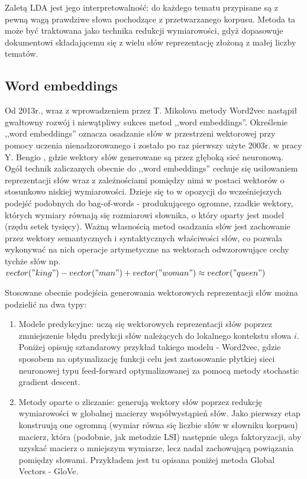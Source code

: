 \documentclass[pl]{minipw} %
\begin{document}
Zaletą LDA jest jego interpretowalność: do każdego tematu przypisane są z pewną wagą prawdziwe słowa pochodzące z przetwarzanego korpusu. Metoda ta może być traktowana jako technika redukcji wymiarowości, gdyż dopasowuje dokumentowi składającemu się z wielu słów reprezentację złożoną z małej liczby tematów.


\subsection{Word embeddings}
Od 2013r., wraz z wprowadzeniem przez T. Mikolova metody Word2vec \cite{word2vec} nastąpił gwałtowny rozwój i niewątpliwy sukces metod ,,word embeddings''. Określenie ,,word embeddings'' oznacza osadzanie słów w przestrzeni wektorowej przy pomocy uczenia nienadzorowanego i zostało po raz pierwszy użyte 2003r. w pracy Y. Bengio \cite{bengio}, gdzie wektory słów generowane są przez głęboką sieć neuronową. Ogół technik zaliczanych obecnie do ,,word embeddings'' cechuje się usiłowaniem reprezentacji słów wraz z zależnościami pomiędzy nimi w postaci wektorów o stosunkowo niskiej wymiarowości. Dzieje się to w opozycji do wcześniejszych podejść podobnych do bag-of-words - produkującego ogromne, rzadkie wektory, których wymiary równają się rozmiarowi słownika, o który oparty jest model (rzędu setek tysięcy). Ważną własnością metod osadzania słów jest zachowanie przez wektory semantycznych i syntaktycznych właściwości słów, co pozwala wykonywać na nich operacje artymetyczne na wektorach odwzorowujące cechy tychże słów np.~$vector("king")-vector("man")+vector("woman") \approx vector("queen")$ 

Stosowane obecnie podejścia generowania wektorowych reprezentacji słów można podzielić na dwa typy:
\begin{enumerate}
	\item Modele predykcyjne: uczą się wektorowych reprezentacji słów poprzez zmniejszenie błędu predykcji słów należących do lokalnego kontekstu słowa $i$. Poniżej opisuję sztandarowy przykład takiego modelu - Word2vec, gdzie sposobem na optymalizację funkcji celu jest zastosowanie płytkiej sieci neuronowej typu feed-forward optymalizowanej za pomocą metody stochastic gradient descent.
	\item Metody oparte o zliczanie: generują wektory słów poprzez redukcję wymiarowości w globalnej macierzy współwystąpień słów.
	Jako pierwszy etap konstruują one ogromną (wymiar równa się liczbie słów w słowniku korpusu) macierz, która (podobnie, jak  metodzie LSI) następnie ulega faktoryzacji, aby uzyskać macierz o mniejszym wymiarze, lecz nadal zachowującą powiązania pomiędzy słowami. Przykładem jest tu opisana poniżej metoda Global Vectors - GloVe.
\end{enumerate}
\end{document}
